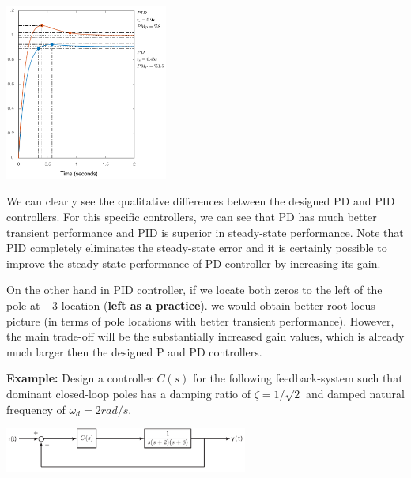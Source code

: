 \documentclass[twoside]{article}
\begin{document}
  \begin{minipage}[h]{1\linewidth}
    \begin{center}
      \includegraphics[width=0.4\textwidth]{PDvsPID}
    \end{center}
  \end{minipage}

\vspace{12 pt}

We can clearly see the qualitative differences between the designed PD
and PID controllers. For this specific controllers, we can see that 
PD has much better transient performance and PID is superior in
steady-state performance. Note that PID completely eliminates the
steady-state error and it is certainly possible to improve the
steady-state performance of PD controller by increasing its gain.

On the other hand in PID controller, if we locate both zeros to the
left of the pole at $-3$ location (\textbf{left as a practice}). we 
would obtain better root-locus picture (in terms of pole locations
 with better transient performance). However, the main trade-off will
be the substantially increased gain values, which is already much
larger then the designed P and PD controllers.

\vspace{12pt}

\textbf{Example:} Design a controller $C(s)$ for the following
feedback-system such that dominant closed-loop poles
has a damping ratio of $\zeta = 1/\sqrt{2}$ and damped natural
frequency of $\omega_d = 2 rad/s$.

\vspace{12 pt}

  \begin{minipage}[h]{1\linewidth}
    \begin{center}
      \includegraphics[width=0.6\textwidth]{example}
    \end{center}
  \end{minipage}
\end{document}
